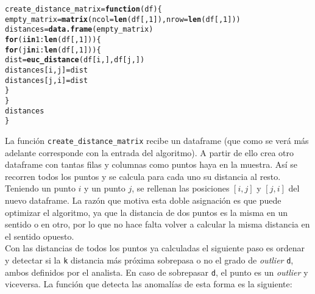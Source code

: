 \documentclass[12pt]{report}\usepackage[]{graphicx}\usepackage[dvipsnames]{xcolor}
\makeatletter
\newcommand{\hlnum}[1]{\textcolor[rgb]{0.686,0.059,0.569}{#1}}%
\newcommand{\hlopt}[1]{\textcolor[rgb]{0,0,0}{#1}}%
\newcommand{\hlstd}[1]{\textcolor[rgb]{0.345,0.345,0.345}{#1}}%
\newcommand{\hlkwa}[1]{\textcolor[rgb]{0.161,0.373,0.58}{\textbf{#1}}}%
\newcommand{\hlkwb}[1]{\textcolor[rgb]{0.69,0.353,0.396}{#1}}%
\newcommand{\hlkwc}[1]{\textcolor[rgb]{0.333,0.667,0.333}{#1}}%
\newcommand{\hlkwd}[1]{\textcolor[rgb]{0.737,0.353,0.396}{\textbf{#1}}}%
\newenvironment{kframe}{%
 \def\at@end@of@kframe{}%
 \ifinner\ifhmode%
  \def\at@end@of@kframe{\end{minipage}}%
  \begin{minipage}{\columnwidth}%
 \fi\fi%
 \def\FrameCommand##1{\hskip\@totalleftmargin \hskip-\fboxsep
 \colorbox{shadecolor}{##1}\hskip-\fboxsep
     \hskip-\linewidth \hskip-\@totalleftmargin \hskip\columnwidth}%
 \MakeFramed {\advance\hsize-\width
   \@totalleftmargin\z@ \linewidth\hsize
   \@setminipage}}%
 {\par\unskip\endMakeFramed%
 \at@end@of@kframe}
\newenvironment{knitrout}{}{} %
\makeatother
\begin{document}
\begin{knitrout}
\color{fgcolor}\begin{kframe}
\begin{alltt}
\hlstd{create_distance_matrix} \hlkwb{=} \hlkwa{function}\hlstd{(}\hlkwc{df}\hlstd{)\{}
        \hlstd{empty_matrix} \hlkwb{=} \hlkwd{matrix}\hlstd{(}\hlkwc{ncol} \hlstd{=} \hlkwd{len}\hlstd{(df[,}\hlnum{1}\hlstd{]),} \hlkwc{nrow} \hlstd{=} \hlkwd{len}\hlstd{(df[,}\hlnum{1}\hlstd{]))}
        \hlstd{distances} \hlkwb{=} \hlkwd{data.frame}\hlstd{(empty_matrix)}
        \hlkwa{for} \hlstd{(i} \hlkwa{in} \hlnum{1}\hlopt{:}\hlkwd{len}\hlstd{(df[,}\hlnum{1}\hlstd{]))\{}
                \hlkwa{for} \hlstd{(j} \hlkwa{in} \hlstd{i}\hlopt{:}\hlkwd{len}\hlstd{(df[,}\hlnum{1}\hlstd{]))\{}
                        \hlstd{dist} \hlkwb{=} \hlkwd{euc_distance}\hlstd{(df[i,], df[j,])}
                        \hlstd{distances[i,j]} \hlkwb{=} \hlstd{dist}
                        \hlstd{distances[j,i]} \hlkwb{=} \hlstd{dist}
                \hlstd{\}}
        \hlstd{\}}
        \hlstd{distances}
\hlstd{\}}
\end{alltt}
\end{kframe}
\end{knitrout}
					
					La función \texttt{create\_distance\_matrix} recibe un dataframe (que como se verá más adelante corresponde con la entrada del algoritmo). A partir de ello crea otro dataframe con tantas filas y columnas como puntos haya en la muestra. Así se recorren todos los puntos y se calcula para cada uno su distancia al resto. Teniendo un punto $i$ y un punto $j$, se rellenan las posiciones $[i,j]$ y $[j,i]$ del nuevo dataframe. La razón que motiva esta doble asignación es que puede optimizar el algoritmo, ya que la distancia de dos puntos es la misma en un sentido o en otro, por lo que no hace falta volver a calcular la misma distancia en el sentido opuesto.\\
					
					Con las distancias de todos los puntos ya calculadas el siguiente paso es ordenar y detectar si la \texttt{k} distancia más próxima sobrepasa o no el grado de \textit{outlier} \texttt{d}, ambos definidos por el analista. En caso de sobrepasar \texttt{d}, el punto es un \textit{outlier} y viceversa. La función que detecta las anomalías de esta forma es la siguiente:
					
\end{document}
